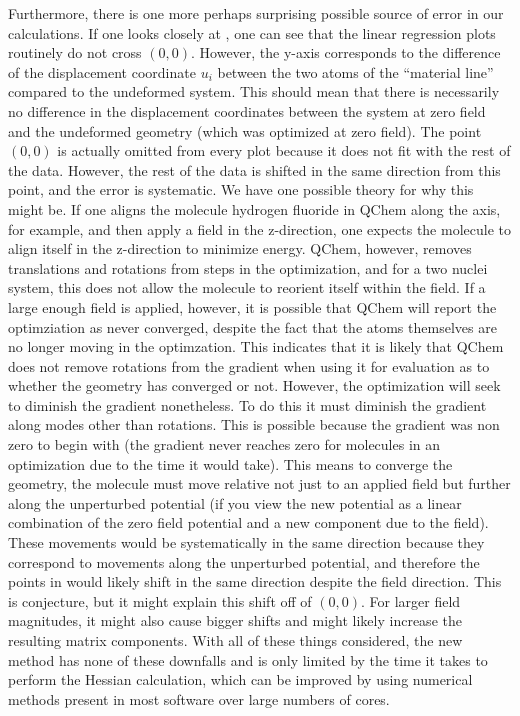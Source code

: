 Furthermore, there is one more perhaps surprising possible source of error in our calculations.  
If one looks closely at , one can see that the linear regression plots
routinely do not cross $(0,0)$.  
However, the y-axis corresponds to the difference of the displacement coordinate $u_i$ between the two atoms of the ``material line'' compared to the 
undeformed system.  
This should mean that there is necessarily no difference in the displacement coordinates between the system at zero field and the undeformed geometry (which was optimized at zero field).  
The point $(0,0)$ is actually omitted from every plot because it does not fit with the rest of the data.  
However, the rest of the data is shifted in the same direction from this point, and the 
error is systematic.  
We have one possible theory for why this might be.  
If one aligns the molecule hydrogen fluoride in QChem along the axis, for example, and then apply a field in the z-direction, one expects
the molecule to align itself in the z-direction to minimize energy.  
QChem, however, removes translations and rotations from steps in the optimization, and for a two nuclei system, this 
does not allow the molecule to reorient itself within the field.  
If a large enough field is applied, however, it is possible that QChem will report the optimziation as never converged, despite the 
fact that the atoms themselves are no longer moving in the optimzation.  
This indicates that it is likely that QChem does not remove rotations from the gradient when using it for 
evaluation as to whether the geometry has converged or not.  
However, the optimization will seek to diminish the gradient nonetheless.  
To do this it must diminish the gradient along modes
other than rotations.  
This is possible because the gradient was non zero to begin with (the gradient never reaches zero for molecules in an optimization due to the time it would take).  
This means to converge the 
geometry, the molecule must move relative not just to an applied field but further along the unperturbed potential (if you view the new potential as a linear combination of the 
zero field potential and a new component due to the field). 
These movements would be systematically in the same direction because they correspond to movements along the unperturbed potential, and therefore the 
points in  would likely shift in the same direction despite the field direction.  
This is conjecture, but it might explain this shift off of $(0,0)$.  
For larger field magnitudes, 
it might also cause bigger shifts and might likely increase the resulting matrix components. 
With all of these things considered, the new method has none of these downfalls and is only 
limited by the time it takes to perform the Hessian calculation, which can be improved by using numerical methods present in most software over large numbers of cores.

